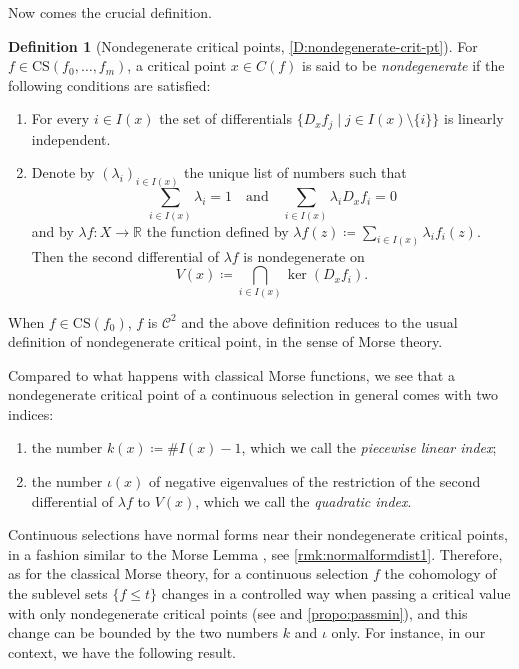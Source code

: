 \documentclass{amsart}
\newcommand{\R}{\mathbb{R}}
\def\lini{k}
\def\quadi{\iota}
\theoremstyle{definition}
\newtheorem{definition}[subsubsection]{Definition}
\theoremstyle{remark}
\begin{document}
Now comes the crucial definition. 

\begin{definition}[Nondegenerate critical points, \cref{D:nondegenerate-crit-pt}]
\label{def:nondegintro}
For $f \in \mathrm{CS}(f_0, \ldots, f_m)$, a critical point $x \in C(f)$ is said to be \emph{nondegenerate} if the following conditions are satisfied:
\begin{enumerate}[label=(\roman*)]
\item \label{eq:indexset} For every $i\in I(x)$ the set of differentials $\{D_x f_j \mid j\in I(x)\setminus \{i\}\}$ is linearly independent.
\item Denote by $(\lambda_i)_{i\in I(x)}$ the unique list of  numbers such that 
\[
\sum_{i \in I(x)} \lambda_i = 1
\quad \textrm{and} \quad
\sum_{i \in I(x)} \lambda_i D_x f_i = 0
\]
and by $\lambda f \colon X\to \R$ the function defined by $\lambda f(z) \coloneqq \sum_{i\in I(x)} \lambda_i f_i(z).$ Then the second differential of $\lambda f$ is nondegenerate on 
\[
V(x) \coloneqq \bigcap_{i\in I(x)} \ker(D_x f_i).
\]
\end{enumerate}
\end{definition}

When $f\in \mathrm{CS}(f_0)$, $f$ is $\mathcal{C}^2$ and the above definition reduces to the usual definition of nondegenerate critical point, in the sense of Morse theory. 

Compared to what happens with classical Morse functions, we see that a nondegenerate critical point of a continuous selection in general comes with two indices: \begin{enumerate}
\item [-]the number  $\lini(x) \coloneqq \#I(x) - 1$, which we call the \emph{piecewise linear index};
\item [-]the number $\quadi(x)$ of negative eigenvalues of the restriction of the second differential of $\lambda f$ to $V(x)$, which we call the \emph{quadratic index}.
\end{enumerate} 
Continuous selections have normal forms near their nondegenerate critical points, in a fashion similar to the Morse Lemma \cite[Lemma~2.2]{milnor1963morse}, see \cref{rmk:normalformdist1}. Therefore, as for the classical Morse theory, for a continuous selection $f$ the cohomology of the sublevel sets $\{f \leq t\}$  changes in a controlled way when passing a critical value with only nondegenerate critical points (see \cite{APS1997} and \cref{propo:passmin}), and this change can be bounded by the two numbers $\lini$ and $\quadi$ only. For instance, in our context, we have the following result.
\end{document}
